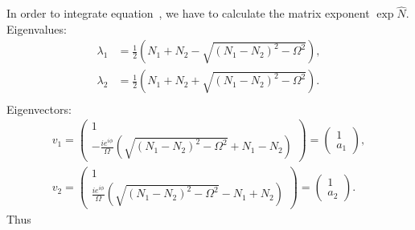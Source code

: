 In order to integrate equation~,
we have to calculate the matrix exponent $\exp \hat{N}$.
Eigenvalues:
\begin{equation*}
\begin{split}
	\lambda_1 & = \frac{1}{2} \left(
		N_1 + N_2 - \sqrt{(N_1 - N_2)^2 - \Omega^2}
	\right), \\
	\lambda_2 & = \frac{1}{2} \left(
		N_1 + N_2 + \sqrt{(N_1 - N_2)^2 - \Omega^2}
	\right). \\
\end{split}
\end{equation*}
Eigenvectors:
\begin{equation*}
\begin{split}
	v_1 = \begin{pmatrix}
		1 \\
		-\frac{i e^{i \phi}}{\Omega} \left(
			\sqrt{(N_1 - N_2)^2 - \Omega^2} + N_1 - N_2
		\right)
	\end{pmatrix}
	= \begin{pmatrix}
		1 \\ a_1
	\end{pmatrix}, \\
	v_2 = \begin{pmatrix}
		1 \\
		\frac{i e^{i \phi}}{\Omega} \left(
			\sqrt{(N_1 - N_2)^2 - \Omega^2} - N_1 + N_2
		\right)
	\end{pmatrix}
	= \begin{pmatrix}
		1 \\ a_2
	\end{pmatrix}.
\end{split}
\end{equation*}
Thus
